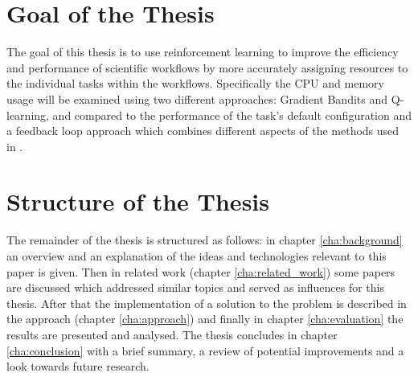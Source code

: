 
\section{Goal of the Thesis}
\label{sec:goal}

The goal of this thesis is to use reinforcement learning to improve the efficiency and performance of scientific workflows by more accurately assigning resources to the individual tasks within the workflows. Specifically the CPU and memory usage will be examined using two different approaches: Gradient Bandits and Q-learning, and compared to the performance of the task's default configuration and a feedback loop approach which combines different aspects of the methods used in \cite{tovarjob,FeedbackBasedAllocation}.

\section{Structure of the Thesis}
\label{sec:structure}

The remainder of the thesis is structured as follows: in chapter \ref{cha:background} an overview and an explanation of the ideas and technologies relevant to this paper is given. Then in related work (chapter \ref{cha:related_work}) some papers are discussed which addressed similar topics and served as influences for this thesis. After that the implementation of a solution to the problem is described in the approach (chapter \ref{cha:approach}) and finally in chapter \ref{cha:evaluation} the results are presented and analysed. The thesis concludes in chapter \ref{cha:conclusion} with a brief summary, a review of potential improvements and a look towards future research.
